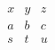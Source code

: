 \documentclass{article}
\begin{document}
\[
  \begin{array}{ccc}
  x & y & z \\
  a & b & c \\
  s & t & u
  \end{array}
\]
\end{document}
